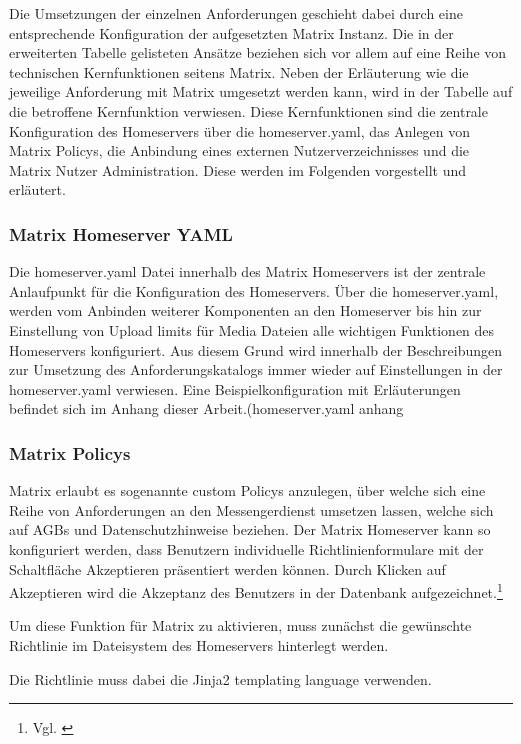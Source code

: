 Die Umsetzungen der einzelnen Anforderungen geschieht dabei durch eine entsprechende Konfiguration der aufgesetzten Matrix Instanz. Die in der erweiterten Tabelle gelisteten Ansätze beziehen sich vor allem auf eine Reihe von technischen Kernfunktionen seitens Matrix. Neben der Erläuterung wie die jeweilige Anforderung mit Matrix umgesetzt werden kann, wird in der Tabelle auf die betroffene Kernfunktion verwiesen. Diese Kernfunktionen sind die zentrale Konfiguration des Homeservers über die homeserver.yaml, das Anlegen von Matrix Policys,
die Anbindung eines externen Nutzerverzeichnisses und die Matrix Nutzer Administration. Diese werden im Folgenden vorgestellt und erläutert.

\subsubsection{Matrix Homeserver YAML}\label{chapter:vdmf}
Die homeserver.yaml Datei innerhalb des Matrix Homeservers ist der zentrale Anlaufpunkt für die Konfiguration des Homeservers.
Über die homeserver.yaml, werden vom Anbinden weiterer Komponenten an den Homeserver bis hin zur Einstellung von Upload limits für Media Dateien alle wichtigen Funktionen des Homeservers konfiguriert. Aus diesem Grund wird innerhalb der Beschreibungen zur Umsetzung des Anforderungskatalogs immer wieder auf Einstellungen in der homeserver.yaml verwiesen. Eine Beispielkonfiguration mit Erläuterungen befindet sich im Anhang dieser Arbeit.(homeserver.yaml anhang

\subsubsection{Matrix Policys}\label{chapter:vdmf}
Matrix erlaubt es sogenannte custom Policys anzulegen, über welche sich eine Reihe von Anforderungen an den Messengerdienst umsetzen lassen, welche sich auf AGBs und Datenschutzhinweise beziehen.
Der Matrix Homeserver kann so konfiguriert werden, dass Benutzern individuelle Richtlinienformulare mit der Schaltfläche \glqq Akzeptieren\grqq{} präsentiert werden können. Durch Klicken auf \glqq Akzeptieren\grqq{} wird die Akzeptanz des Benutzers in der Datenbank aufgezeichnet.\footnote{Vgl. \cite{Matrix.org-custom-policies2020}}

Um diese Funktion für Matrix zu aktivieren, muss zunächst die gewünschte Richtlinie im Dateisystem des Homeservers hinterlegt werden.

Die Richtlinie muss dabei die Jinja2 templating language verwenden.


